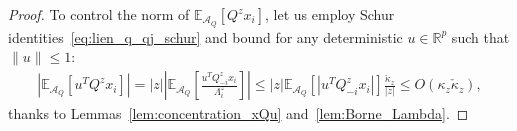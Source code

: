 \documentclass[a4papaer, titlepage]{book}
\begin{document}
\begin{proof}
  To control the norm of $ \mathbb E_{\mathcal A_Q}[Q^z x_i]$, let us employ Schur identities~\eqref{eq:lien_q_qj_schur} and bound for any deterministic $u \in \mathbb R^p$ such that $\|u\|\leq 1$:
  \begin{align*}
    \left\vert \mathbb E_{\mathcal A_Q}[u^TQ^z x_i] \right\vert
    = |z|\left\vert \mathbb E_{\mathcal A_Q} \left[ \frac{ u^TQ_{-i}^z x_i}{\Lambda_i^z} \right] \right\vert
    \leq |z| \mathbb E_{\mathcal A_Q}[ |u^TQ_{-i}^z x_i|]\frac{\check \kappa_z}{|z|} \leq O(\kappa_z\check \kappa_z),
  \end{align*}
  thanks to Lemmas~\ref{lem:concentration_xQu} and~\ref{lem:Borne_Lambda}.%
\end{proof}
\end{document}
